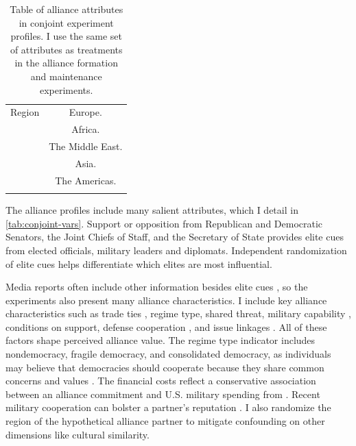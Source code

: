 \documentclass[12pt]{article}
\begin{document}
\begin{table}
\begin{adjustbox}{width = .99\textwidth}
\begin{tabular}{lc}
Region              & Europe. \\ 
                    & Africa. \\
                    & The Middle East. \\ 
                    & Asia. \\   
                    & The Americas. \\ 
                                                                            
\hline \\
\end{tabular}
\end{adjustbox}
\caption{Table of alliance attributes in conjoint experiment profiles. I use the same set of attributes as treatments in the alliance formation and maintenance experiments.} 
\label{tab:conjoint-vars}
\end{table}


The alliance profiles include many salient attributes, which I detail in \autoref{tab:conjoint-vars}. 
Support or opposition from Republican and Democratic Senators, the Joint Chiefs of Staff, and the Secretary of State provides elite cues from elected officials, military leaders and diplomats. 
Independent randomization of elite cues helps differentiate which elites are most influential.


Media reports often include other information besides elite cues \citep{BaumPotter2008}, so the experiments also present many alliance characteristics. 
I include key alliance characteristics such as trade ties \citep{Fordham2010}, regime type, shared threat, military capability \citep{Johnsonetal2015}, conditions on support, defense cooperation \citep{Morrow1994, LeedsAnac2005}, and issue linkages \citep{Poast2012}.
All of these factors shape perceived alliance value. 
The regime type indicator includes nondemocracy, fragile democracy, and consolidated democracy, as individuals may believe that democracies should cooperate because they share common concerns and values \citep{Chuetal2021}. 
The financial costs reflect a conservative association between an alliance commitment and U.S. military spending from \citet{AlleyFuhrmann2021}. 
Recent military cooperation can bolster a partner's reputation \citep{Crescenzietal2012, GannonKent2020}.
I also randomize the region of the hypothetical alliance partner to mitigate confounding on other dimensions like cultural similarity.
\end{document}
